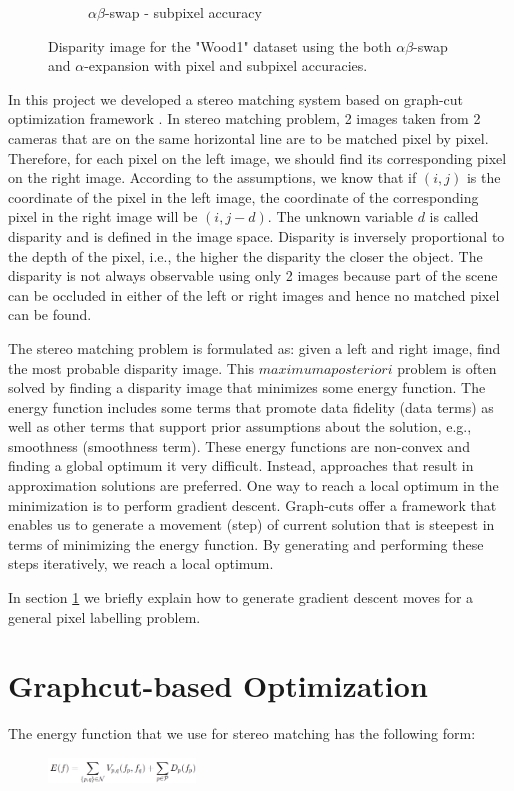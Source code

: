 \documentclass[letterpaper, 10 pt, conference]{ieeeconf}  %
\begin{document}
\begin{figure}[t]
\begin{subfigure}[b]{0.3\textwidth}
                \caption{$\alpha\beta$-swap - subpixel accuracy}
                \label{fig:farm}
        \end{subfigure}
        \caption{Disparity image for the "Wood1" dataset using the both $\alpha\beta$-swap and $\alpha$-expansion with pixel and subpixel accuracies.}
        \label{fig:realmaps}
\end{figure}

In this project we developed a stereo matching system based on graph-cut optimization framework \cite{boykov2001fast}. In stereo matching problem, 2 images taken from 2 cameras that are on the same horizontal line are to be matched pixel by pixel. Therefore, for each pixel on the left image, we should find its corresponding pixel on the right image. According to the assumptions, we know that if $(i,j)$ is the coordinate of the pixel in the left image, the coordinate of the corresponding pixel in the right image will be $(i,j-d)$. The unknown variable $d$ is called disparity and is defined in the image space. Disparity is inversely proportional to the depth of the pixel, i.e., the higher the disparity the closer the object. The disparity is not always observable using only 2 images because part of the scene can be occluded in either of the left or right images and hence no matched pixel can be found.

The stereo matching problem is formulated as: given a left and right image, find the most probable disparity image. This $maximum a posteriori$ problem is often solved by finding a disparity image that minimizes some energy function. The energy function includes some terms that promote data fidelity (data terms) as well as other terms that support prior assumptions about the solution, e.g., smoothness (smoothness term). These energy functions are non-convex and finding a global optimum it very difficult. Instead, approaches that result in approximation solutions are preferred. One way to reach a local optimum in the minimization is to perform gradient descent. Graph-cuts offer a framework that enables us to generate a movement (step) of current solution that is steepest in terms of minimizing the energy function. By generating and performing these steps iteratively, we reach a local optimum. 

In section \ref{graphcut} we briefly explain how to generate gradient descent moves for a general pixel labelling problem.

\section{Graphcut-based Optimization}
\label{graphcut}
The energy function that we use for stereo matching has the following form:
\begin{figure}[h]
                \centering
                \includegraphics[width=0.35\textwidth]{imgs/energy.png}
                \label{fig:farm}
\end{figure}
\end{document}
